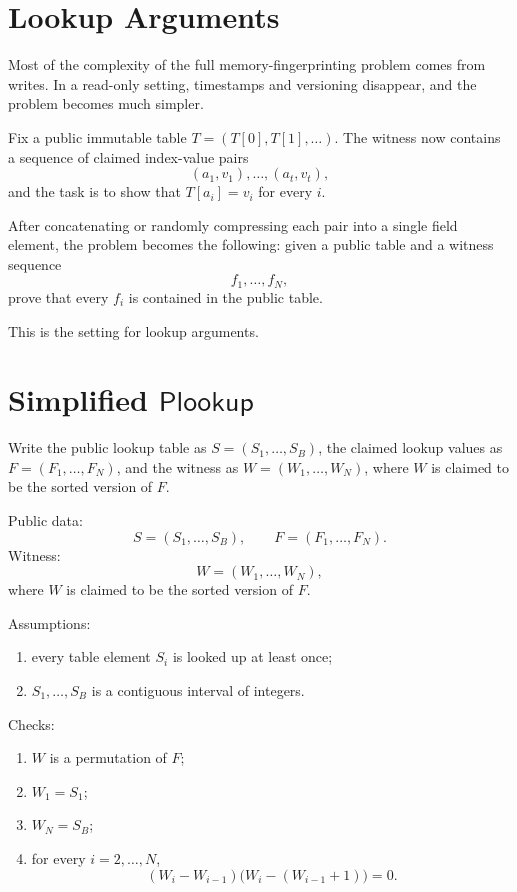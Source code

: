 \documentclass[11pt]{article}
\newcommand{\Plookup}{\ensuremath{\mathsf{Plookup}}}
\begin{document}
\section{Lookup Arguments}

Most of the complexity of the full memory-fingerprinting problem comes from
writes.  In a read-only setting, timestamps and versioning disappear, and the
problem becomes much simpler.

Fix a public immutable table $T = (T[0], T[1], \ldots)$.  The witness now
contains a sequence of claimed index-value pairs
\[
  (a_1,v_1),\ldots,(a_t,v_t),
\]
and the task is to show that $T[a_i] = v_i$ for every $i$.

After concatenating or randomly compressing each pair into a single field
element, the problem becomes the following: given a public table and a witness
sequence
\[
  f_1,\ldots,f_N,
\]
prove that every $f_i$ is contained in the public table.

This is the setting for lookup arguments.

\section{Simplified \texorpdfstring{\Plookup}{Plookup}}

Write the public lookup table as $S = (S_1,\ldots,S_B)$, the claimed lookup
values as $F = (F_1,\ldots,F_N)$, and the witness as
$W = (W_1,\ldots,W_N)$, where $W$ is claimed to be the sorted version of $F$.

\begin{graybox}[title={Simplified \Plookup\ Local Conditions}]
Public data:
\[
  S = (S_1,\ldots,S_B), \qquad F = (F_1,\ldots,F_N).
\]
Witness:
\[
  W = (W_1,\ldots,W_N),
\]
where $W$ is claimed to be the sorted version of $F$.

Assumptions:
\begin{enumerate}
  \item every table element $S_i$ is looked up at least once;
  \item $S_1,\ldots,S_B$ is a contiguous interval of integers.
\end{enumerate}

Checks:
\begin{enumerate}
  \item $W$ is a permutation of $F$;
  \item $W_1 = S_1$;
  \item $W_N = S_B$;
  \item for every $i=2,\ldots,N$,
        \[
          (W_i - W_{i-1})\bigl(W_i - (W_{i-1}+1)\bigr) = 0.
        \]
\end{enumerate}
\end{graybox}
\end{document}
